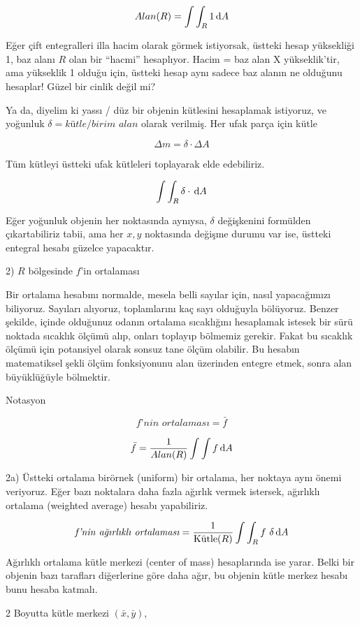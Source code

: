 \documentclass[12pt,fleqn]{article}\usepackage{../../common}
\begin{document}
$$ Alan(R) = \int \int_R 1 \,\mathrm{d} A $$

Eğer çift entegralleri illa hacim olarak görmek istiyorsak, üstteki hesap
yüksekliği 1, baz alanı $R$ olan bir ``hacmi'' hesaplıyor. Hacim = baz alan X
yükseklik'tir, ama yükseklik 1 olduğu için, üstteki hesap aynı sadece baz alanın
ne olduğunu hesaplar! Güzel bir cinlik değil mi?

Ya da, diyelim ki yassı / düz bir objenin kütlesini hesaplamak istiyoruz, ve
yoğunluk $\delta = \textit{kütle} / \textit{birim alan}$ olarak verilmiş. Her
ufak parça için kütle

$$ \Delta m = \delta \cdot \Delta A $$

Tüm kütleyi üstteki ufak kütleleri toplayarak elde edebiliriz. 

$$ \int \int_R \delta \cdot \,\mathrm{d} A $$

Eğer yoğunluk objenin her noktasında aynıysa, $\delta$ değişkenini
formülden çıkartabiliriz tabii, ama her $x,y$ noktasında değişme durumu var
ise, üstteki entegral hesabı güzelce yapacaktır.

2) $R$ bölgesinde $f$'in ortalaması 

Bir ortalama hesabını normalde, mesela belli sayılar için, nasıl
yapacağımızı biliyoruz. Sayıları alıyoruz, toplamlarını kaç sayı olduğuyla
bölüyoruz. Benzer şekilde, içinde olduğunuz odanın ortalama sıcaklığını
hesaplamak istesek bir sürü noktada sıcaklık ölçümü alıp, onları toplayıp
bölmemiz gerekir. Fakat bu sıcaklık ölçümü için potansiyel olarak sonsuz
tane ölçüm olabilir. Bu hesabın matematiksel şekli ölçüm fonksiyonunu alan
üzerinden entegre etmek, sonra alan büyüklüğüyle bölmektir. 

Notasyon

$$ \textit{f'nin ortalaması} = \bar{f} $$

$$ \bar{f} = \frac{1}{Alan(R)} \int \int f \,\mathrm{d} A $$

2a) Üstteki ortalama birörnek (uniform) bir ortalama, her noktaya
aynı önemi veriyoruz. Eğer bazı noktalara daha fazla ağırlık vermek
istersek, ağırlıklı ortalama (weighted average) hesabı yapabiliriz.

$$ 
\textit{f'nin ağırlıklı ortalaması} = \frac{1}{\textrm{Kütle}(R)} 
\int \int_R f \ \delta \,\mathrm{d} A
$$

Ağırlıklı ortalama kütle merkezi (center of mass) hesaplarında ise
yarar. Belki bir objenin bazı tarafları diğerlerine göre daha ağır, bu
objenin kütle merkez hesabı bunu hesaba katmalı. 

2 Boyutta kütle merkezi $(\bar{x},\bar{y})$, 
\end{document}
